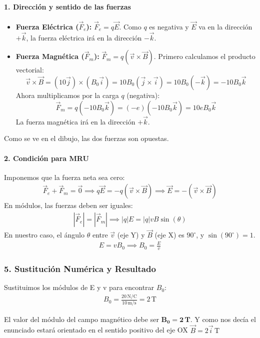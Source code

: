 \paragraph{1. Dirección y sentido de las fuerzas}
\begin{itemize}
    \item \textbf{Fuerza Eléctrica ($\vec{F}_e$):} $\vec{F}_e = q\vec{E}$. Como $q$ es negativa y $\vec{E}$ va en la dirección $+\vec{k}$, la fuerza eléctrica irá en la dirección \textbf{$-\vec{k}$}.
    \item \textbf{Fuerza Magnética ($\vec{F}_m$):} $\vec{F}_m = q(\vec{v} \times \vec{B})$. Primero calculamos el producto vectorial:
    $$ \vec{v} \times \vec{B} = (10\vec{j}) \times (B_0\vec{i}) = 10 B_0 (\vec{j} \times \vec{i}) = 10 B_0 (-\vec{k}) = -10 B_0 \vec{k} $$
    Ahora multiplicamos por la carga $q$ (negativa):
    $$ \vec{F}_m = q(-10 B_0 \vec{k}) = (-e)(-10 B_0 \vec{k}) = 10 e B_0 \vec{k} $$
    La fuerza magnética irá en la dirección \textbf{$+\vec{k}$}.
\end{itemize}
Como se ve en el dibujo, las dos fuerzas son opuestas.

\paragraph{2. Condición para MRU}
Imponemos que la fuerza neta sea cero:
\begin{gather}
    \vec{F}_e + \vec{F}_m = \vec{0} \implies q\vec{E} = -q(\vec{v} \times \vec{B}) \implies \vec{E} = -(\vec{v} \times \vec{B})
\end{gather}
En módulos, las fuerzas deben ser iguales:
\begin{gather}
    |\vec{F}_e| = |\vec{F}_m| \implies |q|E = |q|vB\sin(\theta)
\end{gather}
En nuestro caso, el ángulo $\theta$ entre $\vec{v}$ (eje Y) y $\vec{B}$ (eje X) es $90^\circ$, y $\sin(90^\circ)=1$.
\begin{gather}
    E = v B_0 \implies B_0 = \frac{E}{v}
\end{gather}

\subsubsection*{5. Sustitución Numérica y Resultado}
Sustituimos los módulos de E y v para encontrar $B_0$:
\begin{gather}
    B_0 = \frac{20 \, \text{N/C}}{10 \, \text{m/s}} = 2 \, \text{T}
\end{gather}
\begin{cajaresultado}
    El valor del módulo del campo magnético debe ser $\boldsymbol{B_0 = 2 \, \textbf{T}}$. Y como nos decía el enunciado estará orientado en el sentido positivo del eje OX $\vec{B} = 2 \vec{i} \, \text{T}$
\end{cajaresultado}

